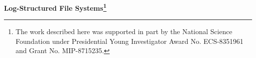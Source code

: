 \pagestyle{empty}
\textwidth=19.8cm
\textheight=8in
\oddsidemargin=-1in
\evensidemargin=-1in
\topmargin=0in

\begin{titlepage}
\begin{center}
\large
{\bf Log-Structured File Systems\thanks{
The work described here was supported in part by the
National Science Foundation under Presidential Young
Investigator Award No. ECS-8351961 and Grant No. MIP-8715235.
}}
\normalsize
\end{center}
\end{titlepage}

